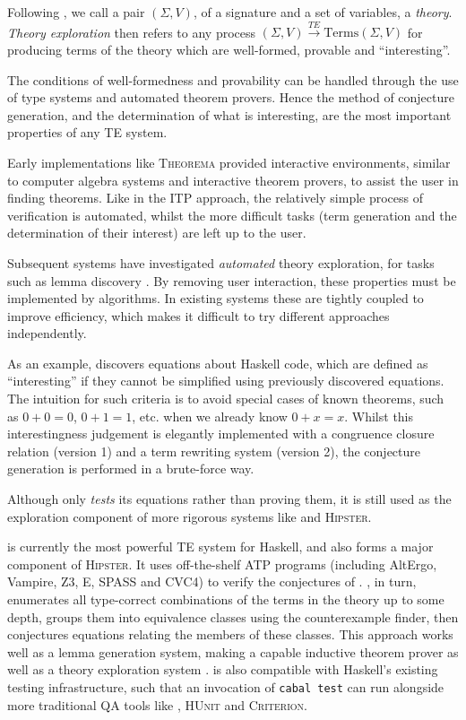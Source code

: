 Following \citep{warburtonscaling}, we call a pair $(\Sigma, V)$, of a signature and a set of variables, a \emph{theory}. \emph{Theory exploration} then refers to any process $(\Sigma, V) \overset{TE}{\rightarrow} \text{Terms}(\Sigma, V)$ for producing terms of the theory which are well-formed, provable and ``interesting''.

The conditions of well-formedness and provability can be handled through the use of type systems and automated theorem provers. Hence the method of conjecture generation, and the determination of what is interesting, are the most important properties of any TE system.

Early implementations like \textsc{Theorema} \citep{buchberger2000theory} provided interactive environments, similar to computer algebra systems and interactive theorem provers, to assist the user in finding theorems. Like in the ITP approach, the relatively simple process of verification is automated, whilst the more difficult tasks (term generation and the determination of their interest) are left up to the user.

Subsequent systems have investigated \emph{automated} theory exploration, for tasks such as lemma discovery \citep{Hipster}. By removing user interaction, these properties must be implemented by algorithms. In existing systems these are tightly coupled to improve efficiency, which makes it difficult to try different approaches independently.

As an example, \qspec{} \citep{QuickSpec} discovers equations about Haskell code, which are defined as ``interesting'' if they cannot be simplified using previously discovered equations. The intuition for such criteria is to avoid special cases of known theorems, such as $0 + 0 = 0$, $0 + 1 = 1$, etc. when we already know $0 + x = x$. Whilst this interestingness judgement is elegantly implemented with a congruence closure relation (version 1) and a term rewriting system
(version 2), the conjecture generation is performed in a brute-force way.

Although \qspec{} only \emph{tests} its equations rather than proving them, it is still used as the exploration component of more rigorous systems like \hspec{} and \textsc{Hipster}.

\hspec{} is currently the most powerful TE system for Haskell, and also forms a major component of \textsc{Hipster}. It uses off-the-shelf ATP programs (including AltErgo, Vampire, Z3, E, SPASS and CVC4) to verify the conjectures of \qspec{}. \qspec{}, in turn, enumerates all type-correct combinations of the terms in the theory up to some depth, groups them into equivalence classes using the \qcheck{} counterexample finder, then conjectures equations relating the members of these classes. This approach works well as a lemma generation system, making \hspec{} a capable inductive theorem prover as well as a theory exploration system \citep{claessen2013automating}. \hspec{} is also compatible with Haskell's existing testing infrastructure, such that an invocation of \texttt{cabal test} can run \hspec{} alongside more traditional QA tools like \qcheck{}, \textsc{HUnit} and \textsc{Criterion}.

